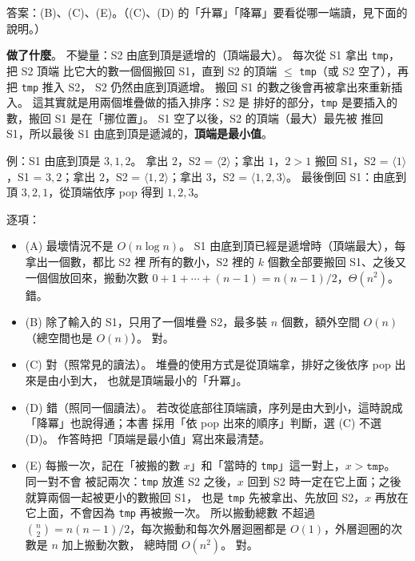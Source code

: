 \begin{pastsoln}
答案：(B)、(C)、(E)。（(C)、(D) 的「升冪」「降冪」要看從哪一端讀，見下面的說明。）

\textbf{做了什麼}。 不變量：S2 由底到頂是遞增的（頂端最大）。 每次從 S1 拿出 \texttt{tmp}，把 S2 頂端
比它大的數一個個搬回 S1，直到 S2 的頂端 $\le$ \texttt{tmp}（或 S2 空了），再把 \texttt{tmp} 推入 S2，
S2 仍然由底到頂遞增。 搬回 S1 的數之後會再被拿出來重新插入。 這其實就是用兩個堆疊做的插入排序：S2 是
排好的部分，\texttt{tmp} 是要插入的數，搬回 S1 是在「挪位置」。 S1 空了以後，S2 的頂端（最大）最先被
推回 S1，所以最後 S1 由底到頂是遞減的，\textbf{頂端是最小值}。

例：S1 由底到頂是 $3, 1, 2$。 拿出 $2$，S2 = $\langle 2\rangle$；拿出 $1$，$2 > 1$ 搬回 S1，S2 =
$\langle 1\rangle$，S1 = $3, 2$；拿出 $2$，S2 = $\langle 1, 2\rangle$；拿出 $3$，S2 = $\langle 1, 2, 3\rangle$。
最後倒回 S1：由底到頂 $3, 2, 1$，從頂端依序 pop 得到 $1, 2, 3$。

逐項：
\begin{itemize}
\item (A) 最壞情況不是 $O(n\log n)$。 S1 由底到頂已經是遞增時（頂端最大），每拿出一個數，都比 S2 裡
所有的數小，S2 裡的 $k$ 個數全部要搬回 S1、之後又一個個放回來，搬動次數 $0 + 1 + \cdots + (n-1) =
n(n-1)/2$，$\Theta(n^2)$。 錯。
\item (B) 除了輸入的 S1，只用了一個堆疊 S2，最多裝 $n$ 個數，額外空間 $O(n)$（總空間也是
$O(n)$）。 對。
\item (C) 對（照常見的讀法）。 堆疊的使用方式是從頂端拿，排好之後依序 pop 出來是由小到大，
也就是頂端最小的「升冪」。
\item (D) 錯（照同一個讀法）。 若改從底部往頂端讀，序列是由大到小，這時說成「降冪」也說得通；本書
採用「依 pop 出來的順序」判斷，選 (C) 不選 (D)。 作答時把「頂端是最小值」寫出來最清楚。
\item (E) 每搬一次，記在「被搬的數 $x$」和「當時的 \texttt{tmp}」這一對上，$x > \texttt{tmp}$。 同一對不會
被記兩次：\texttt{tmp} 放進 S2 之後，$x$ 回到 S2 時一定在它上面；之後就算兩個一起被更小的數搬回 S1，
也是 \texttt{tmp} 先被拿出、先放回 S2，$x$ 再放在它上面，不會因為 \texttt{tmp} 再被搬一次。 所以搬動總數
不超過 $\binom{n}{2} = n(n-1)/2$，每次搬動和每次外層迴圈都是 $O(1)$，外層迴圈的次數是 $n$ 加上搬動次數，
總時間 $O(n^2)$。 對。
\end{itemize}
\end{pastsoln}

